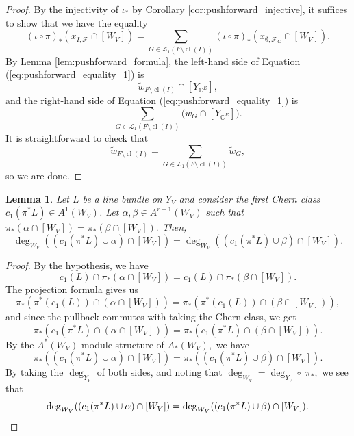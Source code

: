 \documentclass{amsart}
\theoremstyle{plain}
\newtheorem{lemma}[theorem]{Lemma}
\theoremstyle{definition}
\newcommand{\cl}{\operatorname{cl}}
\begin{document}
\begin{proof}
By the injectivity of $\iota_*$ by Corollary \ref{cor:pushforward_injective}, it suffices to show that we have the equality
\begin{equation}
\label{eq:pushforward_equality_1}
{(\iota \circ \pi)}_*(x_{I, \mathscr{F}} \cap [W_V])=\sum_{G \in \mathcal{L}_1(F \setminus \cl(I))}{(\iota \circ \pi)}_*\left( x_{\emptyset, \mathscr{F}_G} \cap [W_V]\right).
\end{equation}
By Lemma \ref{lem:pushforward_formula}, the left-hand side of Equation (\ref{eq:pushforward_equality_1}) is
\begin{equation*}
\label{eq:pushforward_equality_2}
\tilde{w}_{F \setminus \cl(I)} \cap [Y_{\mathbb{C}^E}],
\end{equation*}
and the right-hand side of Equation (\ref{eq:pushforward_equality_1}) is
\begin{equation*}
\label{eq:pushforward_equality_3}
\sum_{G \in \mathcal{L}_1(F \setminus \cl(I))}\big(\tilde{w}_G \cap [Y_{\mathbb{C}^E}]\big).
\end{equation*}
It is straightforward to check that
\[\tilde{w}_{F \setminus \cl(I)} = \sum_{G \in \mathcal{L}_1(F \setminus \cl(I))}\tilde{w}_G,\]
so we are done.
\end{proof}

\begin{lemma}
\label{lem:equality_of_degrees}
    Let $L$ be a line bundle on $Y_V$ and consider the first Chern class $c_1(\pi^*L) \in A^1(W_V)$. Let $\alpha , \beta \in A^{r-1}(W_V)$ such that $\pi_*(\alpha \cap [W_V]) = \pi_*(\beta \cap [W_V]).$  Then,
    \[\deg_{W_V}((c_1(\pi^*L) \cup \alpha) \cap[W_V]) = \deg_{W_V}((c_1(\pi^*L) \cup \beta) \cap [W_V]).\]
\end{lemma}

\begin{proof}   
    By the hypothesis, we have
    \[c_1(L) \cap \pi_*(\alpha \cap [W_V]) = c_1(L) \cap \pi_*(\beta \cap [W_V]).\]
    The projection formula gives us
    \[\pi_*(\pi^*(c_1(L)) \cap (\alpha \cap [W_V])) = \pi_*(\pi^*(c_1(L)) \cap (\beta\cap [W_V])),\]
    and since the pullback commutes with taking the Chern class, we get
    \[\pi_*(c_1(\pi^*L) \cap (\alpha \cap [W_V])) = \pi_*(c_1(\pi^*L) \cap (\beta\cap [W_V])).\]
    By the $A^*(W_{V})$-module structure of $A_*(W_{V}),$ we have
    \[\pi_*((c_1(\pi^*L) \cup  \alpha) \cap [W_V]) = \pi_*((c_1(\pi^*L) \cup \beta) \cap [W_V]).\]
    By taking the $\deg_{Y_V}$ of both sides, and noting that $\deg_{W_V} = \deg_{Y_V} \circ \; \pi_*,$ we see that
    \[\deg_{W_V}((c_1(\pi^*L) \cup  \alpha) \cap [W_V]) = \deg_{W_V}((c_1(\pi^*L) \cup \beta) \cap [W_V]). \qedhere\] 
\end{proof}
\end{document}

